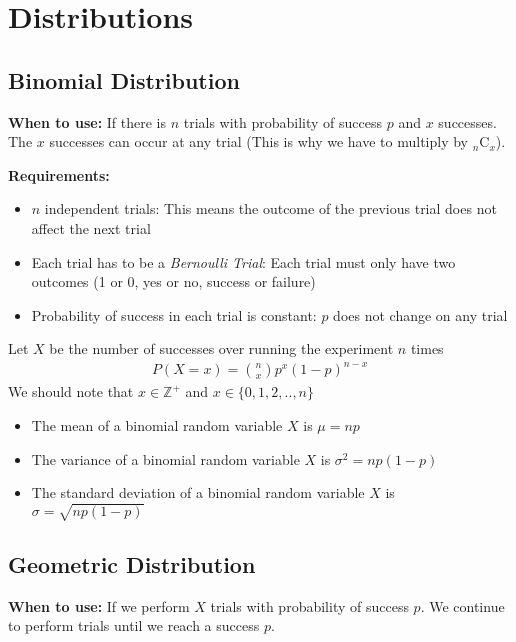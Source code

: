 \documentclass[12pt, titlepage, oneside]{article}
\renewcommand{\b}[1]{\textbf{#1}}
\begin{document}
	
	\setcounter{section}{6}
	\setcounter{page}{19}

    \section{Distributions}
    
    \subsection{Binomial Distribution}

\b{When to use:} If there is $n$ trials with probability of success $p$ and $x$ successes. The $x$ successes can occur at any trial (This is why we have to multiply by $_n\text{C}_x$).
    
    \b{Requirements:}
    \begin{itemize}
      \item $n$ independent trials: This means the outcome of the  previous trial does not affect the next trial
      \item Each trial has to be a \textit{Bernoulli Trial}: Each trial must only have two outcomes (1 or 0, yes or no, success or failure)
      \item Probability of success in each trial is constant: $p$ does not change on any trial
    \end{itemize}

    Let $X$ be the number of successes over running the experiment $n$ times
    \begin{align}
      P(X = x) = {n \choose x} p^x (1-p)^{n-x}
    \end{align}
    We should note that $x \in \mathbb{Z}^+$ and $x \in \{ 0,1,2,..,n\}$ 

    \begin{itemize}
      \item   The mean of a binomial random variable $X$ is $ \mu = np$
      \item  The variance of a binomial random variable $X$ is $\sigma^2 = np(1-p)$
      \item The standard deviation of a binomial random variable $X$ is $\sigma = \sqrt{np(1-p)}$
    \end{itemize}
    
    \subsection{Geometric Distribution}

    \b{When to use:} If we perform $X$ trials with probability of success $p$. We continue to perform trials until we reach a success $p$.
    
\end{document}
